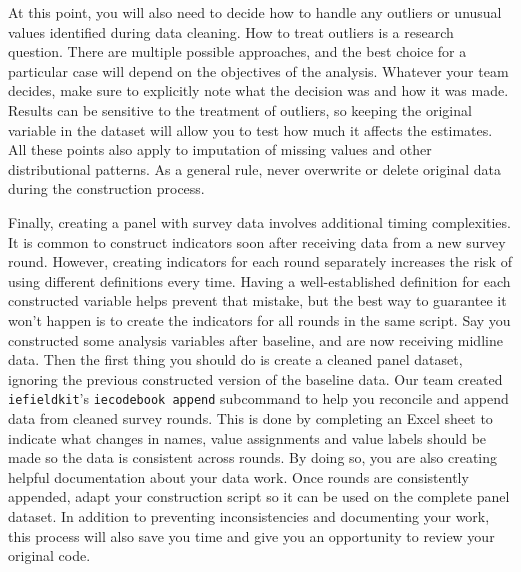 At this point, you will also need to decide how to handle any outliers or unusual values identified during data cleaning. 
How to treat outliers is a research question.
There are multiple possible approaches, 
and the best choice for a particular case will depend on the objectives of the analysis.
Whatever your team decides, make sure to explicitly note what the decision was and how it was made.
Results can be sensitive to the treatment of outliers,
so keeping the original variable in the dataset will allow you to test how much it affects the estimates.
All these points also apply to imputation of missing values and other distributional patterns.
As a general rule, never overwrite or delete original data during the construction process.

Finally, creating a panel with survey data involves additional timing complexities.
It is common to construct indicators soon after receiving data from a new survey round.
However, creating indicators for each round separately increases the risk of using different definitions every time.
Having a well-established definition for each constructed variable helps prevent that mistake,
but the best way to guarantee it won't happen is to create the indicators for all rounds in the same script.
Say you constructed some analysis variables after baseline, and are now receiving midline data.
Then the first thing you should do is create a cleaned panel dataset,
ignoring the previous constructed version of the baseline data.
Our team created \texttt{iefieldkit}'s \texttt{iecodebook append} subcommand
to help you reconcile and append data from cleaned survey rounds.
This is done by completing an Excel sheet to indicate what changes in
names, value assignments and value labels should be made so the data is consistent across rounds.
By doing so, you are also creating helpful documentation about your data work.
Once rounds are consistently appended, 
adapt your construction script so it can be used on the complete panel dataset.
In addition to preventing inconsistencies and documenting your work,
this process will also save you time and give you an opportunity to review your original code.



